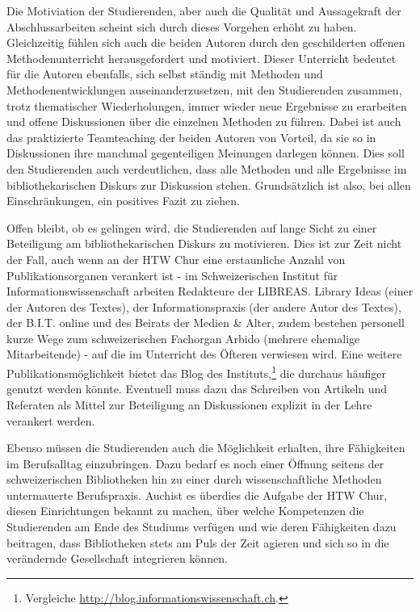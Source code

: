 \documentclass[a4paper,
fontsize=11pt,
oneside,
numbers=noperiodatend,
parskip=half-,
bibliography=totoc,
final
]{scrartcl}
\begin{document}
Die Motiviation der Studierenden, aber auch die Qualität und
Aussagekraft der Abschlussarbeiten scheint sich durch dieses Vorgehen
erhöht zu haben. Gleichzeitig fühlen sich auch die beiden Autoren durch
den geschilderten offenen Methodenunterricht herausgefordert und
motiviert. Dieser Unterricht bedeutet für die Autoren ebenfalls, sich
selbst ständig mit Methoden und Methodenentwicklungen
auseinanderzusetzen, mit den Studierenden zusammen, trotz thematischer
Wiederholungen, immer wieder neue Ergebnisse zu erarbeiten und offene
Diskussionen über die einzelnen Methoden zu führen. Dabei ist auch das
praktizierte Teamteaching der beiden Autoren von Vorteil, da sie so in
Diskussionen ihre manchmal gegenteiligen Meinungen darlegen können. Dies
soll den Studierenden auch verdeutlichen, dass alle Methoden und alle
Ergebnisse im bibliothekarischen Diskurs zur Diskussion stehen.
Grundsätzlich ist also, bei allen Einschränkungen, ein positives Fazit
zu ziehen.

Offen bleibt, ob es gelingen wird, die Studierenden auf lange Sicht zu
einer Beteiligung am bibliothekarischen Diskurs zu motivieren. Dies ist
zur Zeit nicht der Fall, auch wenn an der HTW Chur eine erstaunliche
Anzahl von Publikationsorganen verankert ist - im Schweizerischen
Institut für Informationswissenschaft arbeiten Redakteure der LIBREAS.
Library Ideas (einer der Autoren des Textes), der Informationspraxis
(der andere Autor des Textes), der B.I.T. online und des Beirats der
Medien \& Alter, zudem bestehen personell kurze Wege zum schweizerischen
Fachorgan Arbido (mehrere ehemalige Mitarbeitende) - auf die im
Unterricht des Öfteren verwiesen wird. Eine weitere
Publikationsmöglichkeit bietet das Blog des Instituts,\footnote{Vergleiche
  \url{http://blog.informationswissenschaft.ch}.} die durchaus häufiger
genutzt werden könnte. Eventuell muss dazu das Schreiben von Artikeln
und Referaten als Mittel zur Beteiligung an Diskussionen explizit in der
Lehre verankert werden.

Ebenso müssen die Studierenden auch die Möglichkeit erhalten, ihre
Fähigkeiten im Berufsalltag einzubringen. Dazu bedarf es noch einer
Öffnung seitens der schweizerischen Bibliotheken hin zu einer durch
wissenschaftliche Methoden untermauerte Berufspraxis. Auchist es
überdies die Aufgabe der HTW Chur, diesen Einrichtungen bekannt zu
machen, über welche Kompetenzen die Studierenden am Ende des Studiums
verfügen und wie deren Fähigkeiten dazu beitragen, dass Bibliotheken
stets am Puls der Zeit agieren und sich so in die verändernde
Gesellschaft integrieren können.
\end{document}
